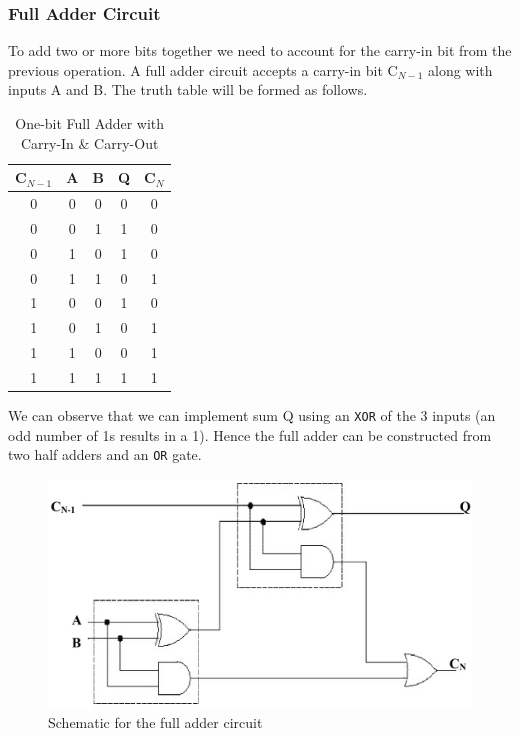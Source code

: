 \subsubsection*{Full Adder Circuit}

To add two or more bits together we need to account for the carry-in bit from the previous operation. A full adder circuit accepts a carry-in bit C$_{N-1}$ along with inputs A and B. The truth table will be formed as follows.

\begin{table}[H]
    \centering
    \begin{tabular}{|c|c|c|c|c|}\hline
    C$_{N-1}$ & A & B & Q & C$_N$ \\ \hline
    0 & 0 & 0 & 0 & 0 \\ 
    0 & 0 & 1 & 1 & 0 \\ 
    0 & 1 & 0 & 1 & 0 \\ 
    0 & 1 & 1 & 0 & 1 \\
    1 & 0 & 0 & 1 & 0 \\ 
    1 & 0 & 1 & 0 & 1 \\ 
    1 & 1 & 0 & 0 & 1 \\ 
    1 & 1 & 1 & 1 & 1 \\ \hline
    \end{tabular}
    \caption{One-bit Full Adder with Carry-In \& Carry-Out}
\end{table}

We can observe that we can implement sum Q using an \verb|XOR| of the 3 inputs (an odd number of 1s results in a 1). Hence the full adder can be constructed from two half adders and an \verb|OR| gate.

\begin{figure}[H]
    \centering
    \includegraphics[width=0.85\columnwidth]{images/full-adder.png}
    \caption{Schematic for the full adder circuit}
    \label{full-adder}
\end{figure}

